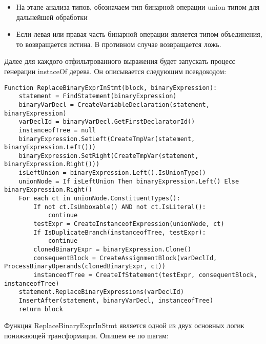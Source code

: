 \begin{itemize}[left=2em]
    \item На этапе анализа типов, обозначаем тип бинарной операции union типом для дальнейшей обработки
    \item Если левая или правая часть бинарной операции является типом объединения, то возвращается истина.
    В противном случае возвращается ложь.
\end{itemize}
Далее для каждого отфильтрованного выражения будет запускать процесс генерации instaceOf дерева.
Он описывается следующим псевдокодом:

\begin{lstlisting}[label={lst:binaryOp}]
Function ReplaceBinaryExprInStmt(block, binaryExpression):
    statement = FindStatement(binaryExpression)
    binaryVarDecl = CreateVariableDeclaration(statement, binaryExpression)
    varDeclId = binaryVarDecl.GetFirstDeclaratorId()
    instanceofTree = null
    binaryExpression.SetLeft(CreateTmpVar(statement, binaryExpression.Left()))
    binaryExpression.SetRight(CreateTmpVar(statement, binaryExpression.Right()))
    isLeftUnion = binaryExpression.Left().IsUnionType()
    unionNode = If isLeftUnion Then binaryExpression.Left() Else binaryExpression.Right()
    For each ct in unionNode.ConstituentTypes():
        If not ct.IsUnboxable() AND not ct.IsLiteral():
            continue
        testExpr = CreateInstanceofExpression(unionNode, ct)
        If IsDuplicateBranch(instanceofTree, testExpr):
            continue
        clonedBinaryExpr = binaryExpression.Clone()
        consequentBlock = CreateAssignmentBlock(varDeclId, ProcessBinaryOperands(clonedBinaryExpr, ct))
        instanceofTree = CreateIfStatement(testExpr, consequentBlock, instanceofTree)
    statement.ReplaceBinaryExpressions(varDeclId)
    InsertAfter(statement, binaryVarDecl, instanceofTree)
    return block
\end{lstlisting}
Функция ReplaceBinaryExprInStmt является одной из двух основных логик понижающей трансформации.
Опишем ее по шагам:


